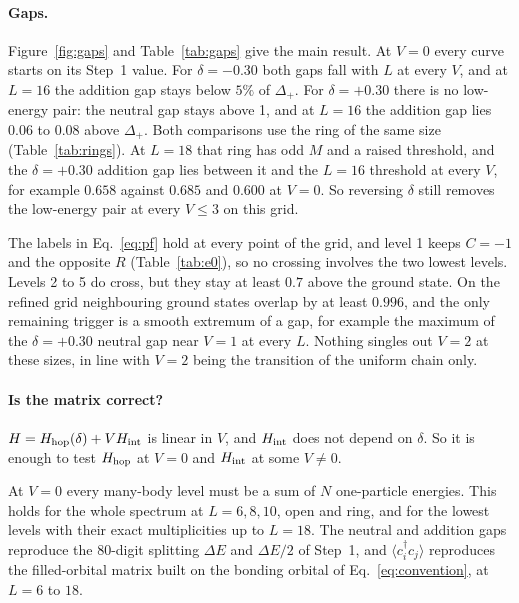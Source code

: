 \documentclass[11pt,a4paper]{article}
\newcommand{\dg}{^{\dagger}}
\begin{document}
\paragraph{Gaps.}
Figure~\ref{fig:gaps} and Table~\ref{tab:gaps} give the main result.
At $V=0$ every curve starts on its Step~1 value.
For $\delta=-0.30$ both gaps fall with $L$ at every $V$, and at $L=16$ the addition gap stays below $5\%$ of $\Delta_+$.
For $\delta=+0.30$ there is no low-energy pair: the neutral gap stays above 1, and at $L=16$ the addition gap lies $0.06$ to $0.08$ above $\Delta_+$.
Both comparisons use the ring of the same size (Table~\ref{tab:rings}).
At $L=18$ that ring has odd $M$ and a raised threshold, and the $\delta=+0.30$ addition gap lies between it and the $L=16$ threshold at every $V$, for example $0.658$ against $0.685$ and $0.600$ at $V=0$.
So reversing $\delta$ still removes the low-energy pair at every $V\le3$ on this grid.

The labels in Eq.~\eqref{eq:pf} hold at every point of the grid, and level 1 keeps $C=-1$ and the opposite $R$ (Table~\ref{tab:e0}), so no crossing involves the two lowest levels.
Levels 2 to 5 do cross, but they stay at least $0.7$ above the ground state.
On the refined grid neighbouring ground states overlap by at least $0.996$, and the only remaining trigger is a smooth extremum of a gap, for example the maximum of the $\delta=+0.30$ neutral gap near $V=1$ at every $L$.
Nothing singles out $V=2$ at these sizes, in line with $V=2$ being the transition of the uniform chain only.

\paragraph{Is the matrix correct?}
$H=H_{\rm hop}(\delta)+VH_{\rm int}$ is linear in $V$, and $H_{\rm int}$ does not depend on $\delta$.
So it is enough to test $H_{\rm hop}$ at $V=0$ and $H_{\rm int}$ at some $V\neq0$.

At $V=0$ every many-body level must be a sum of $N$ one-particle energies.
This holds for the whole spectrum at $L=6,8,10$, open and ring, and for the lowest levels with their exact multiplicities up to $L=18$.
The neutral and addition gaps reproduce the 80-digit splitting $\Delta E$ and $\Delta E/2$ of Step~1, and $\langle c_i\dg c_j\rangle$ reproduces the filled-orbital matrix built on the bonding orbital of Eq.~\eqref{eq:convention}, at $L=6$ to $18$.
\end{document}
